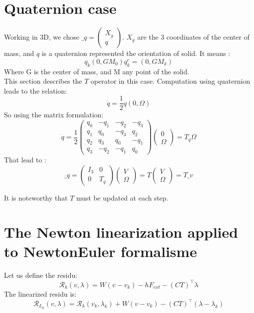 \section{Quaternion case}
Working in 3D, we chose $\_q= \left(\begin{array}{l} X_g \\q \end{array}\right) $. $X_g$ are the 3 coordinates of the center of mass, and $q$ is a quaternion
  represented the orientation of solid. It means :
  \[q_k(0,GM_0)q_k^c = (0,GM_k)\]
Where G is the center of mass, and M any point of the solid.\\
This section describes the $T$ operator in this case. Computation using quaternion leads to the relation:
\[\dot q = \frac{1}{2} q (0,\Omega)\]
So using the matrix formulation:
\[\dot q = \frac{1}{2}  \left(\begin{array}{cccc} q_0&-q_1&-q_2&-q_3 \\ q_1&q_0&-q_3&q_2\\
  q_2&q_3&q_0&-q_1\\ q_3&-q_2&-q_1&q_0\end{array}\right)  \left(\begin{array}{c} 0 \\ \Omega
  \end{array}\right) =
  T_q   \Omega  \]
  That lead to :
  \[ \dot \_q = \left(\begin{array}{cc} I_3 & 0 \\ 0 &
  T_q \end{array}\right) \left(\begin{array}{c} V\\ \Omega  \end{array}\right)  = T
  \left(\begin{array}{c} V\\ \Omega  \end{array}\right)=T \_v\]

It is noteworthy that $T$ must be updated at each step.

\section{The Newton linearization applied to NewtonEuler formalisme}
  Let us define the residu:
\begin{equation}
  \label{eq:newton_NE1_residu}
  \mathcal R_k (v,\lambda) =W(v-v_k)-hF_{ext}-(CT)^\top\lambda
\end{equation}
The linearized residu is:
\begin{equation}
  \label{eq:newton_NE1_residuL}
  \mathcal R_{L_k} (v,\lambda) =\mathcal R_k (v_k,\lambda_k)+W(v-v_k)-(CT)^\top(\lambda - \lambda_k)
\end{equation}

